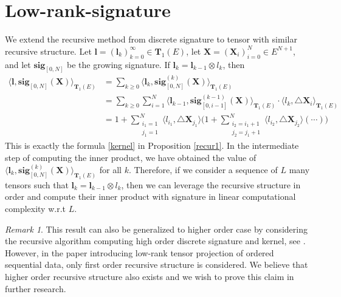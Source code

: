 \documentclass[12pt]{report}
\theoremstyle{definition}
\theoremstyle{remark}
\newtheorem*{remark}{Remark}
\begin{document}
\section{Low-rank-signature}
We extend the recursive method from discrete signature to tensor with similar recursive structure. Let $\mathbf{l} = (\mathbf{l}_{k})_{k=0}^{\infty} \in \mathbf{T}_{1}(E)$, let $\mathbf{X} = (\mathbf{X}_{i})_{i=0}^{N} \in E^{N+1}$, and let $\mathbf{sig}_{[0,N]}$ be the growing signature. If $\mathbf{l}_{k} = \mathbf{l}_{k-1}\otimes l_{k}$, then
  \begin{equation}
    \begin{split}
     \langle \mathbf{l}, \mathbf{sig}_{[0,N]}(\mathbf{X}) \rangle_{\mathbf{T}_{1}(E)} &= \sum_{k\geq 0}\langle \mathbf{l}_{k} , \mathbf{sig}^{(k)}_{[0,N]}(\mathbf{X}) \rangle_{\mathbf{T}_{1}(E)} \\
     &= \sum_{k\geq 0}\sum_{i=1}^{N} \langle \mathbf{l}_{k-1} ,\mathbf{sig}^{(k-1)}_{[0,i-1]}(\mathbf{X})\rangle_{\mathbf{T}_{1}(E)}\cdot\langle l_{k},\triangle \mathbf{X}_{i}\rangle_{\mathbf{T}_{1}(E)} \\
     &= 1 + \sum_{\substack{i_{1}=1 \\ j_{1} = 1}}^{N}\langle l_{i_{1}},  \triangle \mathbf{X}_{j_{1}} \rangle\Big(1 + \sum_{\substack{i_{2}=i_{1}+1 \\ j_{2} = j_{1}+1}}^{N}\langle l_{i_{2}},  \triangle \mathbf{X}_{j_{2}} \rangle(\cdots)\Big)
    \end{split}
  \end{equation}
  This is exactly the formula \eqref{kernel} in Proposition \ref{recur1}. In the intermediate step of computing the inner product, we have obtained the value of $\langle \mathbf{l}_{k} , \mathbf{sig}^{(k)}_{[0,N]}(\mathbf{X}) \rangle_{\mathbf{T}_{1}(E)}$ for all $k$. Therefore, if we consider a sequence of $L$ many tensors such that $\mathbf{l}_{k} = \mathbf{l}_{k-1}\otimes l_{k}$, then we can leverage the recursive structure in order and compute their inner product with signature in linear computational complexity w.r.t $L$.
  \begin{remark}
    This result can also be generalized to higher order case by considering the recursive algorithm computing high order discrete signature and kernel, see \cite{kiraly2019kernels}. However, in the paper \cite{toth2020seq2tens} introducing low-rank tensor projection of ordered sequential data, only first order recursive structure is considered. We believe that higher order recursive structure also exists and we wish to prove this claim in further research. 
  \end{remark} 
  
\end{document}
